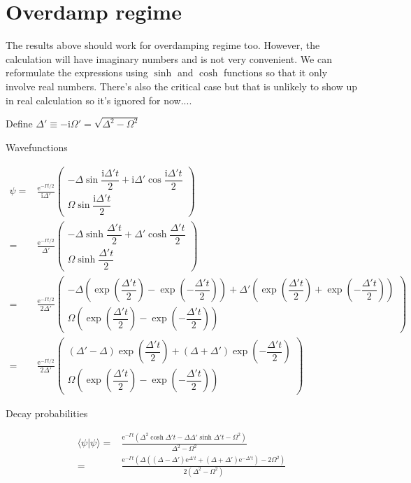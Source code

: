 \documentclass[10pt,fleqn]{article}
\newcommand{\ue}{\mathrm{e}}
\newcommand{\ui}{\mathrm{i}}
\newcommand{\eqar}[1]
{
  \begin{align*}
    #1
  \end{align*}
}
\newcommand{\paren}[1]{{\left({#1}\right)}}
\begin{document}
\section{Overdamp regime}
The results above should work for overdamping regime too.
However, the calculation will have imaginary numbers and is not very convenient.
We can reformulate the expressions using $\sinh$ and $\cosh$ functions so that it only involve
real numbers. There's also the critical case but that is unlikely to show up in real calculation
so it's ignored for now....

Define $\Delta'\equiv-\ui\Omega'=\sqrt{\Delta^2-\Omega^2}$

Wavefunctions
\eqar{
  \psi=&\frac{\ue^{-\Gamma t/2}}{\ui\Delta'}\begin{pmatrix}
    -\Delta\sin\dfrac{\ui\Delta't}{2}+\ui\Delta'\cos\dfrac{\ui\Delta't}{2}\\
    \Omega\sin\dfrac{\ui\Delta't}{2}
  \end{pmatrix}\\
  =&\frac{\ue^{-\Gamma t/2}}{\Delta'}\begin{pmatrix}
    -\Delta\sinh\dfrac{\Delta't}{2}+\Delta'\cosh\dfrac{\Delta't}{2}\\
    \Omega\sinh\dfrac{\Delta't}{2}
  \end{pmatrix}\\
  =&\frac{\ue^{-\Gamma t/2}}{2\Delta'}\begin{pmatrix}
    -\Delta\paren{\exp\paren{\dfrac{\Delta't}{2}}-\exp\paren{-\dfrac{\Delta't}{2}}}+\Delta'\paren{\exp\paren{\dfrac{\Delta't}{2}}+\exp\paren{-\dfrac{\Delta't}{2}}}\\
    \Omega\paren{\exp\paren{\dfrac{\Delta't}{2}}-\exp\paren{-\dfrac{\Delta't}{2}}}
  \end{pmatrix}\\
  =&\frac{\ue^{-\Gamma t/2}}{2\Delta'}\begin{pmatrix}
    \paren{\Delta'-\Delta}\exp\paren{\dfrac{\Delta't}{2}}+\paren{\Delta+\Delta'}\exp\paren{-\dfrac{\Delta't}{2}}\\
    \Omega\paren{\exp\paren{\dfrac{\Delta't}{2}}-\exp\paren{-\dfrac{\Delta't}{2}}}
  \end{pmatrix}
}
Decay probabilities
\eqar{
  \langle\psi|\psi\rangle=&\frac{\ue^{-\Gamma t}\paren{\Delta^2\cosh\Delta't-\Delta\Delta'\sinh\Delta't-\Omega^2}}{\Delta^2-\Omega^2}\\
  =&\frac{\ue^{-\Gamma t}\paren{\Delta\paren{\paren{\Delta-\Delta'}\ue^{\Delta't}+\paren{\Delta+\Delta'}\ue^{-\Delta't}}-2\Omega^2}}{2\paren{\Delta^2-\Omega^2}}
}
\end{document}
